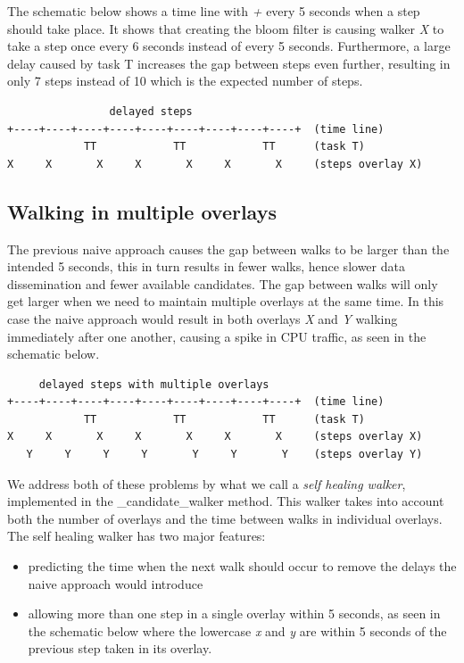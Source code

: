The schematic below shows a time line with \emph{+} every 5 seconds when a
step should take place.  It shows that creating the bloom filter is
causing walker \emph{X} to take a step once every 6 seconds instead of
every 5 seconds.  Furthermore, a large delay caused by task T
increases the gap between steps even further, resulting in only 7
steps instead of 10 which is the expected number of steps.

\begin{verbatim}
                delayed steps
+----+----+----+----+----+----+----+----+----+  (time line)
            TT            TT            TT      (task T)
X     X       X     X       X     X       X     (steps overlay X)
\end{verbatim}
\subsection{Walking in multiple overlays}
\label{sec-7-2}
The previous naive approach causes the gap between walks to be larger
than the intended 5 seconds, this in turn results in fewer walks,
hence slower data dissemination and fewer available candidates.  The
gap between walks will only get larger when we need to maintain
multiple overlays at the same time.  In this case the naive approach
would result in both overlays \emph{X} and \emph{Y} walking immediately after
one another, causing a spike in CPU traffic, as seen in the schematic
below.

\begin{verbatim}
     delayed steps with multiple overlays
+----+----+----+----+----+----+----+----+----+  (time line)
            TT            TT            TT      (task T)
X     X       X     X       X     X       X     (steps overlay X)
   Y     Y     Y     Y       Y     Y       Y    (steps overlay Y)
\end{verbatim}

We address both of these problems by what we call a \emph{self healing
walker}, implemented in the \_candidate\_walker method\footnotemark[5]{}.
This walker takes into account both the number of overlays and the
time between walks in individual overlays.  The self healing walker
has two major features:
\begin{itemize}
\item predicting the time when the next walk should occur to remove the
delays the naive approach would introduce
\item allowing more than one step in a single overlay within 5 seconds, as
seen in the schematic below where the lowercase \emph{x} and \emph{y} are
within 5 seconds of the previous step taken in its overlay.
\end{itemize}

